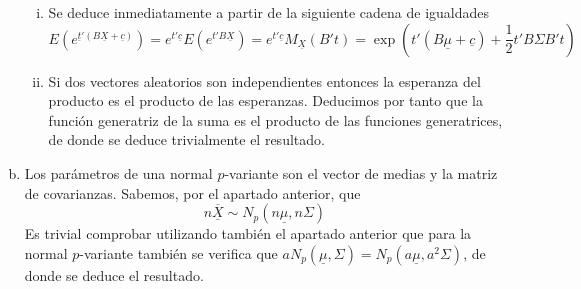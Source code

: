 \documentclass[twoside]{article}
\newcommand{\media}[1]{{\overline{#1}}}
\newcommand{\muestra}[1]{{\underline{#1}}}
\newcommand{\m}[1]{{\muestra{#1}}}
\newcommand{\mX}{{\muestra{X}}}
\begin{document}
\begin{solucion}
\begin{enumerate}[(a)]
\begin{enumerate}[i.]
\item Se deduce inmediatamente a partir de la siguiente cadena de igualdades
\[ E\left(e^{\m{t}'(B\mX+\muestra{c})}\right) = e^{t'\muestra{c}}E\left(e^{t'B\mX}\right) = e^{t'\muestra{c}}M_\muestra{X}(B't) = \exp\left(t'(B\muestra{\mu}+\muestra{c})+\frac{1}{2}t'B\Sigma B't\right)\]
\item Si dos vectores aleatorios son independientes entonces la esperanza del producto es el producto de las esperanzas. Deducimos por tanto que la función generatriz de la suma es el producto de las funciones generatrices, de donde se deduce trivialmente el resultado.
\end{enumerate}
\newpage
\item Los parámetros de una normal $p$-variante son el vector de medias y la matriz de covarianzas. Sabemos, por el apartado anterior, que 
$$
n\media{\mX}\sim N_p(n\muestra{\mu},n\Sigma)
$$
Es trivial comprobar utilizando también el apartado anterior que para la normal $p$-variante también se verifica que $a N_p(\muestra{\mu},\Sigma)= N_p(a\muestra{\mu},a^2\Sigma)$, de donde se deduce el resultado.
\end{enumerate}
\end{solucion}
\newpage
\end{document}
